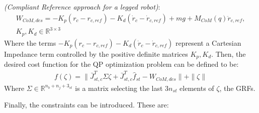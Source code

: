 \begin{definition}\label{legged_compliant_reference}
    \textit{(Compliant Reference approach for a legged robot)}: 
    \begin{gather}\label{legged_compliant_reference_eq}
        W_{CoM,des}=-K_p\left(r_c-r_{c,ref}\right)-K_d\left(\dot{r}_{c}-\dot{r}_{c,ref}\right)+mg+M_{CoM}(q)\ddot{r}_{c,ref},\\
        K_p,K_d\in\mathbb{R}^{3\times 3}
    \end{gather}
    Where the terms $-K_p\left(r_c-r_{c,ref}\right)-K_d\left(\dot{r}_{c}-\dot{r}_{c,ref}\right)$ represent a Cartesian Impedance term controlled by the positive definite matrices $K_p,K_d$. Then, the desired cost function for the QP optimization problem can be defined to be:
    \begin{gather}\label{legged_compliant_cost}
        f(\zeta)=\|\bar{J}_{st,c}^{T}\Sigma\zeta+\bar{J}_{st,c}^{T}\hat{f}_{st}-W_{CoM,des}\|+\|\zeta\|
    \end{gather}
    Where $\Sigma\in\mathbb{R}^{n_b+n_j+3_{st}}$ is a matrix selecting the last $3n_{st}$ elements of $\zeta$, the GRFs.
\end{definition}
Finally, the constraints can be introduced. These are:
